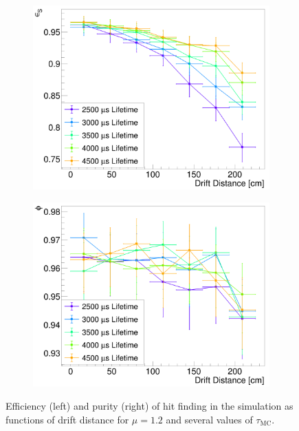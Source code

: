 \documentclass[10pt,a4paper]{article}
\begin{document}
\begin{figure}
\centering
\begin{subfigure}{0.45\textwidth}
\centering
\includegraphics[width=\textwidth]{canveffdriftlife.png}
\end{subfigure}
\begin{subfigure}{0.45\textwidth}
\centering
\includegraphics[width=\textwidth]{canvpurdriftlife.png}
\end{subfigure}
\caption{Efficiency (left) and purity (right) of hit finding in the simulation as functions of drift distance for $\mu=1.2$ and several values of $\tau_{\text{MC}}$.}
\label{fig:pureff}
\end{figure}
\end{document}
